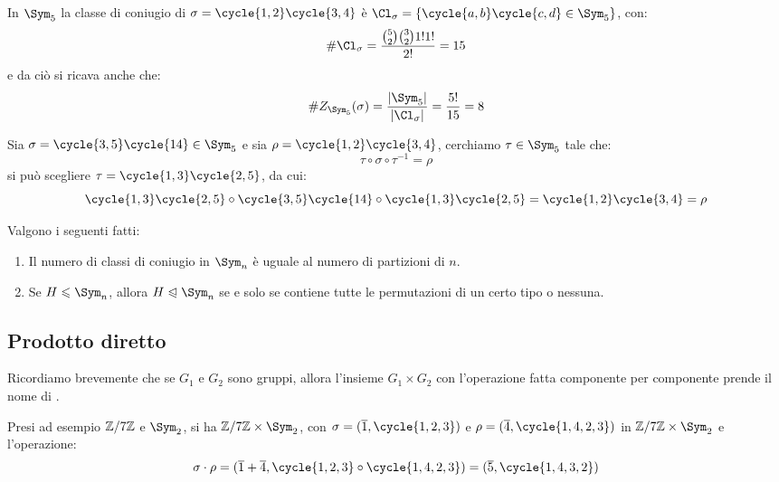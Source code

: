 \documentclass[11pt]{scrartcl}
\begin{document}
\begin{example}
    In $\Sym_{5}$ la classe di coniugio di $\sigma = \cycle{1,2}\cycle{3,4}$ è $\Cl_\sigma = \{\cycle{a,b}\cycle{c,d} \in \Sym_{5}\}$, con:
        \[ \#\Cl_\sigma = \frac{\binom{5}{2}\binom{3}{2}1!1!}{2!} = 15
            \]
    e da ciò si ricava anche che:
        \[ \#Z_{\Sym_{5}}(\sigma) = \frac{|\Sym_{5}|}{|\Cl_\sigma|} = \frac{5!}{15} = 8
            \]
\end{example}

\begin{example}
    Sia $\sigma = \cycle{3,5}\cycle{14} \in \Sym_{5}$ e sia $\rho = \cycle{1,2}\cycle{3,4}$, cerchiamo $\tau \in \Sym_{5}$ tale che:
        \[ \tau\circ\sigma\circ\tau^{-1} = \rho
            \]
    si può scegliere $\tau = \cycle{1,3}\cycle{2,5}$, da cui:
        \[ \cycle{1,3}\cycle{2,5} \circ \cycle{3,5}\cycle{14} \circ \cycle{1,3}\cycle{2,5} = \cycle{1,2}\cycle{3,4} = \rho
            \]
\end{example}

\begin{corollary}
    \label{c:1.68}
    Valgono i seguenti fatti:
        \begin{enumerate}[(1)]
            \item Il numero di classi di coniugio in $\Sym_n$ è uguale al numero di partizioni di $n$.
            \item Se $H \leqslant \Sym_n$, allora $H \trianglelefteqslant \Sym_n$ se e solo se contiene tutte le permutazioni di un certo tipo o nessuna.
        \end{enumerate}
\end{corollary}

\pagebreak

\subsection{Prodotto diretto}
Ricordiamo brevemente che se $G_1$ e $G_2$ sono gruppi, allora l'insieme $G_1 \times G_2$ con l'operazione fatta componente per componente prende il nome di .

\begin{example}
    Presi ad esempio $\mathbb{Z}/{7}\mathbb{Z}$ e $\Sym_2$, si ha $\Z7 \times \Sym_2$, con $\sigma = (\overline 1, \cycle{1,2,3})$ e $\rho = (\overline 4, \cycle{1,4,2,3})$ in $\Z7 \times \Sym_2$ e l'operazione:
        \[ \sigma \cdot \rho = (\overline 1 + \overline 4, \cycle{1,2,3} \circ \cycle{1,4,2,3}) = (\overline 5, \cycle{1,4,3,2})
            \]
\end{example}
\end{document}
